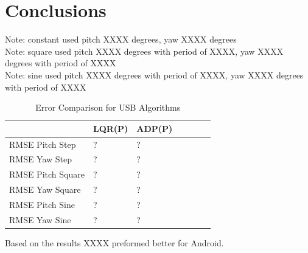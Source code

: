 \section{Conclusions}
Note: constant used pitch XXXX degrees, yaw XXXX degrees\\
Note: square used pitch XXXX degrees with period of XXXX, yaw XXXX degrees with period of XXXX\\
Note: sine used pitch XXXX degrees with period of XXXX, yaw XXXX degrees with period of XXXX\\
\begin{table}[h!]
    \centering
    \begin{tabular}{l|l|l|l|l|l|l}
        \toprule
        \textbf{} & \textbf{LQR(P)} & \textbf{ADP(P)} \\
        \toprule
        RMSE Pitch Step & ? & ?  \\
        RMSE Yaw Step & ? & ? \\
        RMSE Pitch Square & ? & ? \\
        RMSE Yaw Square & ? & ? \\
        RMSE Pitch Sine & ? & ? \\
        RMSE Yaw Sine & ? & ? \\
        \bottomrule
    \end{tabular}
    \caption{Error Comparison for USB Algorithms}
    \label{tab:USB_RMSE}
\end{table}
Based on the results XXXX preformed better for Android.




